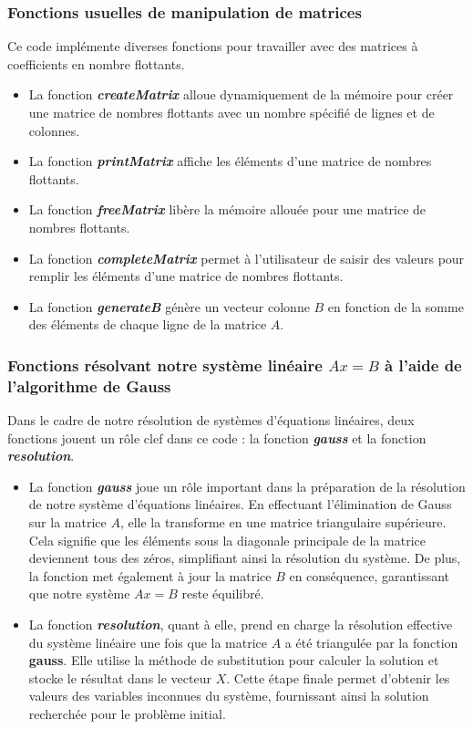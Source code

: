 \subsubsection{Fonctions usuelles de manipulation de matrices}\label{fonctusu}
Ce code implémente diverses fonctions pour travailler avec des matrices à coefficients en nombre flottants.\\
\begin{itemize}
\item La fonction \textit{\textbf{createMatrix}} alloue dynamiquement de la mémoire pour créer une matrice de nombres flottants avec un nombre spécifié de lignes et de colonnes.
\item La fonction \textit{\textbf{printMatrix}} affiche les éléments d'une matrice de nombres flottants.
\item La fonction \textit{\textbf{freeMatrix}} libère la mémoire allouée pour une matrice de nombres flottants.
\item La fonction \textit{\textbf{completeMatrix}} permet à l'utilisateur de saisir des valeurs pour remplir les éléments d'une matrice de nombres flottants.
\item La fonction \textit{\textbf{generateB}} génère un vecteur colonne $B$ en fonction de la somme des éléments de chaque ligne de la matrice $A$.
\end{itemize}

\subsubsection{Fonctions résolvant notre système linéaire $Ax=B$ à l'aide de l'algorithme de Gauss}
Dans le cadre de notre résolution de systèmes d'équations linéaires, deux fonctions jouent un rôle clef dans ce code : la fonction \textit{\textbf{gauss}} et la fonction \textit{\textbf{resolution}}.\\

\begin{itemize}
\item La fonction \textit{\textbf{gauss}} joue un rôle important dans la préparation de la résolution de notre système d'équations linéaires. En effectuant l'élimination de Gauss sur la matrice $A$, elle la transforme en une matrice triangulaire supérieure. Cela signifie que les éléments sous la diagonale principale de la matrice deviennent tous des zéros, simplifiant ainsi la résolution du système. De plus, la fonction met également à jour la matrice $B$ en conséquence, garantissant que notre système $Ax=B$ reste équilibré.\\

\item La fonction \textit{\textbf{resolution}}, quant à elle, prend en charge la résolution effective du système linéaire une fois que la matrice $A$ a été triangulée par la fonction \textbf{gauss}. Elle utilise la méthode de substitution pour calculer la solution et stocke le résultat dans le vecteur $X$. Cette étape finale permet d'obtenir les valeurs des variables inconnues du système, fournissant ainsi la solution recherchée pour le problème initial.\\
\end{itemize}


